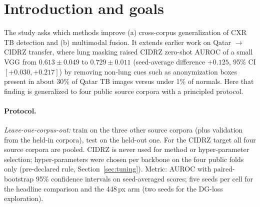 \documentclass[10pt,a4paper]{article}
\begin{document}
\begin{abstract}
\paragraph{Revision note 2.} VinDr-CXR was added as a second external cohort (Section~\ref{sec:vindr}): same eight tuned configurations, five seeds, trained on the four public sources only, with weighted metrics because the evaluation sample is enriched for TB.
\paragraph{Revision note 3.} Material that was in the accompanying slide deck but not in this report was added: example images and the lung-mask illustration, the fold layout, the shortcut-control table, a backbone table, one-line descriptions of the DG methods, worked examples for artefact-adjusted AUROC, ECE and Platt scaling, a bootstrap of the CIDRZ oracle operating points (Section~\ref{sec:why-cidrz}), next steps, and a glossary (Appendix~\ref{app:glossary}).\paragraph{Revision note 4.} Three open items were closed: RAD-DINO at 448\,px was run on VinDr-CXR (Section~\ref{sec:res448}); the fused text + X-ray scores were checked against the WHO profile (Section~\ref{sec:why-cidrz}); and the calibration and summary scripts now accept the weighted VinDr target.\end{abstract}

\section{Introduction and goals}
The study asks which methods improve (a) cross-corpus generalization of CXR TB detection and (b) multimodal fusion. It extends earlier work on Qatar $\rightarrow$ CIDRZ transfer, where lung masking raised CIDRZ zero-shot AUROC of a small VGG from $0.613\pm0.049$ to $0.729\pm0.011$ (seed-average difference $+0.125$, 95\% CI $[+0.030,+0.217]$) by removing non-lung cues such as anonymization boxes present in about 30\% of Qatar TB images versus under 1\% of normals. Here that finding is generalized to four public source corpora with a principled protocol.

\paragraph{Protocol.} \emph{Leave-one-corpus-out:} train on the three other source corpora (plus validation from the held-in corpora), test on the held-out one. For the CIDRZ target all four source corpora are pooled. CIDRZ is never used for method or hyper-parameter selection; hyper-parameters were chosen per backbone on the four public folds only (pre-declared rule, Section~\ref{sec:tuning}). Metric: AUROC with paired-bootstrap 95\% confidence intervals on seed-averaged scores; five seeds per cell for the headline comparison and the 448\,px arm (two seeds for the DG-loss exploration).
\end{document}
